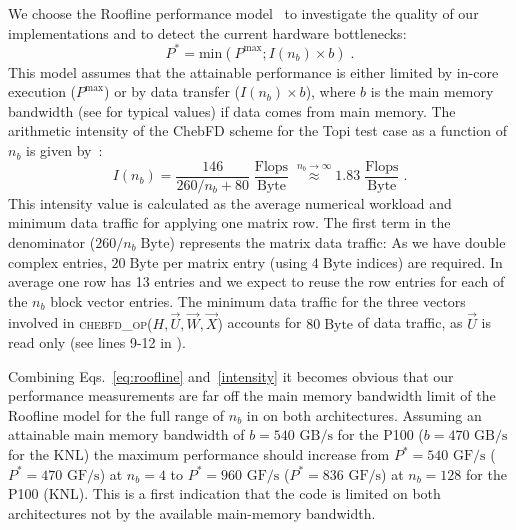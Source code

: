 \documentclass[letterpaper]{llncs}
\newcommand{\Pmax}{\ensuremath{P^\text{max}}\xspace}
\begin{document}
\label{sec:perfmodel}
We choose the Roofline performance model~\cite{Roofline} to investigate the quality of our implementations and to detect the current hardware bottlenecks:
\begin{equation}
    P^* = \text{min}\left(\Pmax;I(n_b)\times b\right)\;.
\label{eq:roofline}
\end{equation}
This model assumes that the attainable performance is either limited
by in-core execution ($\Pmax$) or by data transfer ($I(n_b)\times b$),
where $b$ is the main memory bandwidth (see  for typical
values) if data comes from main memory. The arithmetic intensity of
the ChebFD scheme for the Topi test case as a function of $n_b$ is
given by~\cite{Pieper15ChebFD}:
\begin{equation}
    I(n_b) = \frac{146}{260/n_b + 80} \;\frac{\text{Flops}}{\text{Byte}}\; \stackrel{ n_b
      \rightarrow \infty}{\approx} 1.83\;\frac{\text{Flops}}{\text{Byte}}\;.
    \label{intensity}
\end{equation}
This intensity value is calculated as the average numerical
workload and minimum data traffic for applying one matrix row. The
first term in the denominator ($260/n_b \; {\text{Byte}}$) represents
the matrix data traffic: As we have double complex entries,
$20\;\text{Byte}$ per matrix entry (using $4\;\text{Byte}$ indices)
are required. In average one row has 13 entries and we expect to reuse
the row entries for each of the $n_b$ block vector entries. The
minimum data traffic for the three vectors involved in
\textsc{chebfd\_op($H,\vec U, \vec W, \vec X$)} accounts for
$80\;\text{Byte}$ of data traffic, as \textsc{$\vec U$} is read only
(see lines 9-12 in ).

Combining Eqs.~\ref{eq:roofline} and~\ref{intensity} it becomes obvious that our
performance measurements are far off the main memory bandwidth limit
of the Roofline model for the full range of $n_b$ in
 on both architectures. Assuming an
attainable main memory bandwidth of $b=\text{540 GB/s}$ for the P100
($b=\text{470 GB/s}$ for the KNL) the maximum performance should
increase from $P^*=\text{540 GF/s}$ ($P^*=\text{470 GF/s}$) at $n_b=4$
to $P^*=\text{960 GF/s}$ ($P^*=\text{836 GF/s}$) at $n_b=128$ for the
P100 (KNL). This is a first indication that the code is limited on
both architectures not by the available main-memory bandwidth.
\end{document}
